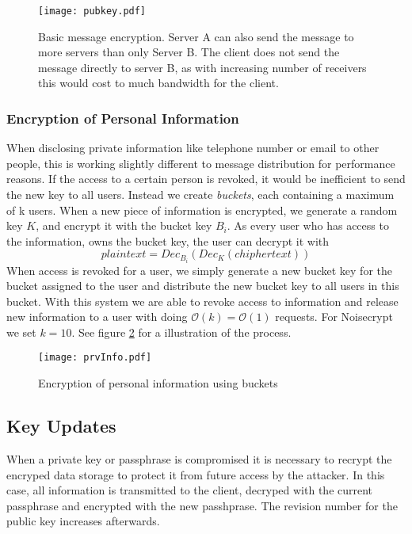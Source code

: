 \documentclass{scrartcl}
\begin{document}
 \begin{figure}[ht]
	\centering
  \texttt{[image: pubkey.pdf]}
	\caption{Basic message encryption. Server A can also send the message to more servers than only Server B. The client does not send the message directly to server B, as with increasing number of receivers this would cost to much bandwidth for the client.}
	\label{fig2}
\end{figure}


  \subsubsection{Encryption of Personal Information}
  When disclosing private information like telephone number or email to other people, this is working slightly different to message distribution for performance reasons.  If the access to a certain person is revoked, it would be inefficient to send the new key to all users. Instead we create  \textit{buckets}, each containing a maximum of k users. When a new piece of information is encrypted, we generate a random key $K$, and encrypt it with the bucket key $B_i$. As every user who has access to the information, owns the bucket key, the user can decrypt it with
  $$
  plaintext = Dec_{B_i}({Dec_K(chiphertext)})
  $$
  When access is revoked for a user, we simply generate a new bucket key for the bucket assigned to the user and distribute the new bucket key to all users in this bucket. With this system we are able to revoke access to information and release new information to a user with doing $\mathcal O(k) = \mathcal O(1)$ requests. For Noisecrypt we set $k = 10$. See figure \ref{fig3} for a illustration of the process.
  
  
   \begin{figure}[ht]
	\centering
  \texttt{[image: prvInfo.pdf]}
	\caption{Encryption of personal information using buckets}
	\label{fig3}
\end{figure}

    \subsection{Key Updates}
    When a private key or passphrase is compromised  it is necessary to recrypt the encryped data storage to protect it from future access by the attacker. In this case, all information is transmitted to the client, decryped with the current passphrase and encrypted with the new passhprase. The revision number for the public key increases afterwards. 
\end{document}
